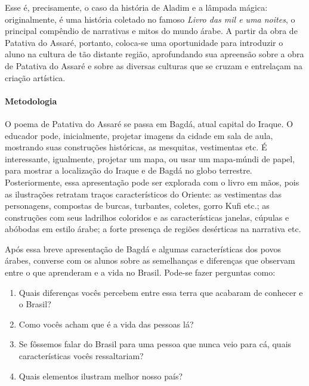 \documentclass[11pt]{extarticle}
\begin{document}
Esse é, precisamente, o caso da história de Aladim e a lâmpada mágica: originalmente, é uma história coletado no famoso \textit{Livro das mil e uma noites}, o principal compêndio de narrativas e mitos do mundo árabe. A partir da obra de Patativa do Assaré, portanto, coloca-se uma oportunidade para introduzir o aluno na cultura de tão distante região, aprofundando sua apreensão sobre a obra de Patativa do Assaré e sobre as diversas culturas que se cruzam e entrelaçam na criação artística.

\paragraph{Metodologia} O poema de Patativa do Assaré se passa em Bagdá, atual capital do Iraque. O educador pode, inicialmente, projetar imagens da cidade em sala de aula, mostrando suas construções históricas, as mesquitas, vestimentas etc. É interessante, igualmente, projetar um mapa, ou usar um mapa-múndi de papel, para mostrar a localização do Iraque e de Bagdá no globo terrestre. Posteriormente, essa apresentação pode ser explorada com o livro em mãos, pois as ilustrações retratam traços característicos do Oriente: as vestimentas das personagens, compostas de burcas, turbantes, coletes, gorro Kufi etc.; as construções com seus ladrilhos coloridos e as características janelas, cúpulas e abóbodas em estilo árabe; a forte presença de regiões desérticas na narrativa etc.

Após essa breve apresentação de Bagdá e algumas características dos povos árabes, converse com os alunos sobre as semelhanças e diferenças que observam entre o que aprenderam e a vida no Brasil. 
Pode-se fazer perguntas como:

\begin{enumerate}
\item Quais diferenças vocês percebem entre essa terra que acabaram de conhecer e o Brasil?

\item Como vocês acham que é a vida das pessoas lá? 

\item Se fôssemos falar do Brasil para uma pessoa que nunca veio para cá, quais características vocês ressaltariam?

\item Quais elementos ilustram melhor nosso país?

\end{enumerate}

\end{document}
